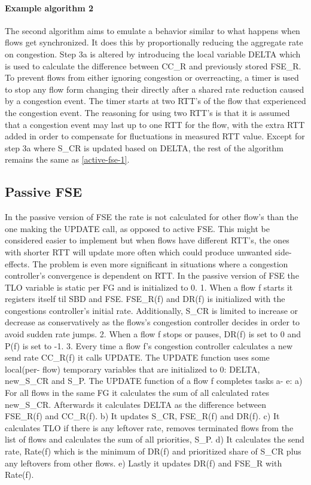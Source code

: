 \paragraph{Example algorithm 2}
The second algorithm aims to emulate a behavior similar to what happens when flows get synchronized.
It does this by proportionally reducing the aggregate rate on congestion.
Step 3a is altered by introducing the local variable DELTA which is used to calculate the difference between CC\_R and previously stored FSE\_R. 
To prevent flows from either ignoring congestion or overreacting, a timer is used to stop any flow form changing their directly after a shared rate reduction caused by a congestion event. 
The timer starts at two RTT's of the flow that experienced the congestion event.
The reasoning for using two RTT's is that it is assumed that a congestion event may last up to one RTT for the flow, with the extra RTT added in order to compensate for fluctuations in measured RTT value.
Except for step 3a where S\_CR is updated based on DELTA, the rest of the algorithm remains the same as \ref{active-fse-1}.


\subsection{Passive FSE}
In the passive version of FSE the rate is not calculated for other flow's than the one making the UPDATE call, as opposed to active FSE.
This might be considered easier to implement but when flows have different RTT's, the ones with shorter RTT will update more often which could produce unwanted side- effects.
The problem is even more significant in situations where a congestion controller's convergence is dependent on RTT. %
In the passive version of FSE the TLO variable is static per FG and is initialized to 0. 
1. When a flow f starts it registers itself til SBD and FSE. FSE\_R(f) and DR(f) is initialized with the congestions controller's initial rate. 
Additionally, S\_CR is limited to increase or decrease as conservatively as the flows's congestion controller decides in order to avoid sudden rate jumps.
2. When a flow f stops or pauses, DR(f) is set to 0 and P(f) is set to -1. %
3. Every time a flow f's congestion controller calculates a new send rate CC\_R(f) it calls UPDATE.
The UPDATE function uses some local(per- flow) temporary variables that are initialized to 0: DELTA, new\_S\_CR and S\_P.
The UPDATE function of a flow f completes tasks a- e:
a) For all flows in the same FG it calculates the sum of all calculated rates new\_S\_CR.
Afterwards it calculates DELTA as the difference between FSE\_R(f) and CC\_R(f).
b) It updates S\_CR, FSE\_R(f) and DR(f).
c) It calculates TLO if there is any leftover rate, removes terminated flows from the list of flows and calculates the sum of all priorities, S\_P.
d) It calculates the send rate, Rate(f) which is the minimum of DR(f) and prioritized share of S\_CR plus any leftovers from other flows.
e) Lastly it updates DR(f) and FSE\_R with Rate(f).


